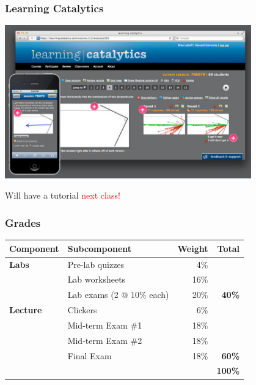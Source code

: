 \documentclass[10pt]{beamer}
\begin{document}
\begin{frame}[t]
\frametitle{Learning Catalytics}
\vspace{0.25cm}

	\begin{center}
		\includegraphics[width=0.8\textwidth]{figures/learning.png}
		
		\vspace{0.25cm}
		
		Will have a tutorial \textcolor{red}{next class!}
	\end{center}

\end{frame}


\begin{frame}[t]
\frametitle{Grades}
\vspace{0.5cm}

	\begin{center}
		\begin{tabular}{l l r r}
			\textbf{Component} & \textbf{Subcomponent} & \textbf{Weight} & \textbf{Total}\\
			\midrule
				\textbf{Labs} & Pre-lab quizzes & 4\% &\\
				& Lab worksheets & 16\% &\\
				& Lab exams (2 @ 10\% each) & 20\% & \textbf{40\%}\\
			\midrule
				\textbf{Lecture} & Clickers & 6\% &\\
				& Mid-term Exam \#1 & 18\% &\\
				& Mid-term Exam \#2 & 18\% &\\
				& Final Exam & 18\% & \textbf{60\%}\\
			\midrule
				& & & \textbf{100\%}					
		\end{tabular}
	\end{center}	
\end{frame}
\end{document}
